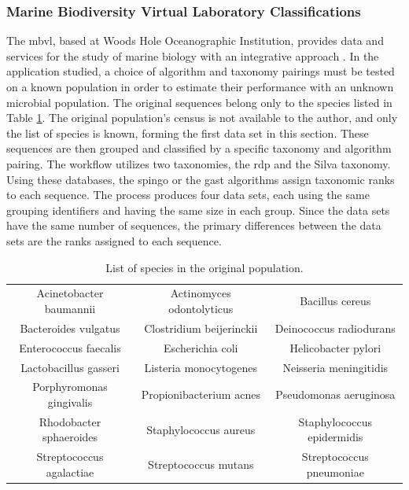 \subsubsection{Marine Biodiversity Virtual Laboratory Classifications} \label{sec:MBVL}

The \gls{mbvl}, based at Woods Hole Oceanographic Institution, provides data and services for the study of marine biology with an integrative approach \cite{mbvl}.
In the application studied, a choice of algorithm and taxonomy pairings must be tested on a known population in order to estimate their performance with an unknown microbial population.
The original sequences belong only to the species listed in Table \ref{species_table}.
The original population's census is not available to the author, and only the list of species is known, forming the first data set in this section.
These sequences are then grouped and classified by a specific taxonomy and algorithm pairing.
The workflow utilizes two taxonomies, the \gls{rdp} and the Silva taxonomy.
Using these databases, the \gls{spingo} or the \gls{gast} algorithms assign taxonomic ranks to each sequence.
The process produces four data sets, each using the same grouping identifiers and having the same size in each group.
Since the data sets have the same number of sequences, the primary differences between the data sets are the ranks assigned to each sequence.

\begin{table}
	\caption{List of species in the original population.}
	\label{species_table}
	\centering
	\setlength{\tabcolsep}{2pt}
	\begin{tabular}{|c|c|c|}
		\hline
		Acinetobacter baumannii & Actinomyces odontolyticus & Bacillus cereus \\
		Bacteroides vulgatus & Clostridium beijerinckii & Deinococcus radiodurans \\
		Enterococcus faecalis & Escherichia coli & Helicobacter pylori \\
		Lactobacillus gasseri & Listeria monocytogenes & Neisseria meningitidis\\
		Porphyromonas gingivalis & Propionibacterium acnes & Pseudomonas aeruginosa \\
		Rhodobacter sphaeroides & Staphylococcus aureus & Staphylococcus epidermidis\\
		Streptococcus agalactiae & Streptococcus mutans & Streptococcus pneumoniae \\
		\hline
	\end{tabular}
\end{table}

